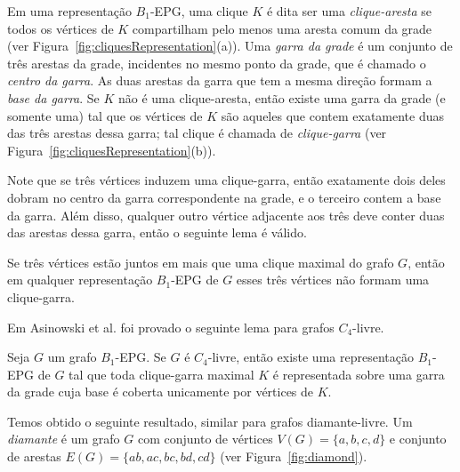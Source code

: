 Em uma representação $B_1$-EPG, uma clique $K$ é dita ser uma \textit{clique-aresta} se todos os vértices de $K$ compartilham pelo menos uma aresta comum da grade (ver Figura~\ref{fig:cliquesRepresentation}(a)).
 Uma \textit{garra da grade} é um conjunto de três arestas da grade, incidentes no mesmo ponto da grade, que é chamado o \textit{centro da garra}. As duas arestas da garra que tem a mesma direção formam a  \textit{ base da garra}. Se $K$ não é uma clique-aresta, então existe uma garra da grade   (e somente uma) tal que os vértices de  $K$ são aqueles que contem exatamente duas das três arestas dessa garra; tal clique é chamada de   \textit{clique-garra} \cite{golumbic2009} (ver Figura~\ref{fig:cliquesRepresentation}(b)).

    
    

Note que se três vértices induzem uma clique-garra, então exatamente dois deles dobram no centro da garra correspondente na grade, e o terceiro contem a base da garra.
Além disso, qualquer outro vértice adjacente aos três deve conter duas das arestas dessa garra, então o seguinte lema é válido.

\begin{lema}\label{lem:cliquesMaximais}
Se três vértices estão juntos em mais que uma  clique maximal do grafo $G$, então em qualquer representação $B_1$-EPG de $G$ esses três vértices não formam uma  clique-garra.
\end{lema}



Em Asinowski et al. \cite{ries2009} foi provado o seguinte lema para grafos $C_4$-livre.

\begin{lema} \cite{ries2009} \label{lem:lemaBRies2009}
Seja $G$ um grafo $B_1$-EPG. Se $G$ é $C_4$-livre, então existe uma representação $B_1$-EPG de $G$ tal que toda clique-garra maximal $K$ é representada sobre uma  garra da grade cuja base é coberta unicamente por vértices de $K$.
\end{lema}


Temos obtido o seguinte resultado, similar para grafos diamante-livre. Um \textit{diamante} é um grafo  $G$ com conjunto de vértices  $V(G) = \{a, b, c, d\}$ e conjunto de arestas $E(G)=\{ab, ac,bc, bd,cd\}$ (ver Figura~\ref{fig:diamond}). %



